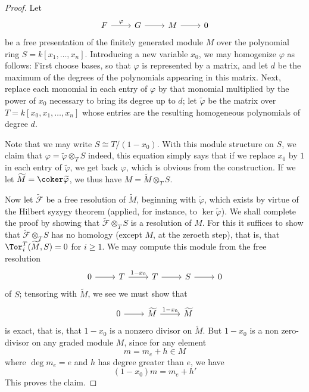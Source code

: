 \begin{proof}
Let 
\[\begin{tikzcd}
F\ar[r,"\varphi"]&G\ar[r]&M\ar[r]&0
\end{tikzcd}\] 
be a free presentation of the finitely generated module $M$ over the polynomial ring $S=k[x_1,\dots,x_n]$. Introducing a new variable $x_0$, we may homogenize $\varphi$ as follows: First choose bases, so that $\varphi$ is represented by a matrix, and let $d$ be the maximum of the degrees of the polynomials appearing in this matrix. Next, replace each monomial in each entry of $\varphi$ by that monomial multiplied by the power of $x_0$ necessary to bring its degree up to $d$; let $\widetilde{\varphi}$ be the matrix over $T=k[x_0,x_1,\dots,x_n]$ whose entries are the resulting homogeneous polynomials of degree $d$.\par
Note that we may write $S\cong T/(1-x_0)$. With this module structure on
$S$, we claim that $\varphi=\widetilde{\varphi}\otimes_TS$ indeed, this equation simply says that if we replace $x_0$ by $1$ in each entry of $\widetilde{\varphi}$, we get back $\varphi$, which is obvious from the construction. If we let $\widetilde{M}=\coker\widetilde{\varphi}$, we thus have $M=\widetilde{M}\otimes_TS$.\par
Now let $\widetilde{\mathcal{F}}$ be a free resolution of $\widetilde{M}$, beginning with $\widetilde{\varphi}$, which exists by virtue of the Hilbert syzygy theorem (applied, for instance, to $\ker\widetilde{\varphi}$). We shall complete the proof by showing that $\widetilde{\mathcal{F}}\otimes_TS$ is a resolution of $M$. For this it suffices to show that $\widetilde{\mathcal{F}}\otimes_TS$ has no homology (except $M$, at the zeroeth step), that is, that $\Tor^T_i(\widetilde{M},S)=0$ for $i\geq1$. We may compute this module from the free resolution
\[\begin{tikzcd}
0\ar[r]&T\ar[r,"1-x_0"]&T\ar[r]&S\ar[r]&0
\end{tikzcd}\]
of $S$; tensoring with $\widetilde{M}$, we see we must show that
\[\begin{tikzcd}
0\ar[r]&\widetilde{M}\ar[r,"1-x_0"]&\widetilde{M}
\end{tikzcd}\]
is exact, that is, that $1-x_0$ is a nonzero divisor on $\widetilde{M}$. But $1-x_0$ is a non zero-divisor on any graded module $M$, since for any element
\[m=m_e+h\in M\]
where $\deg m_e=e$ and $h$ has degree greater than $e$, we have
\[(1-x_0)m=m_e+h'\]
This proves the claim.
\end{proof}
